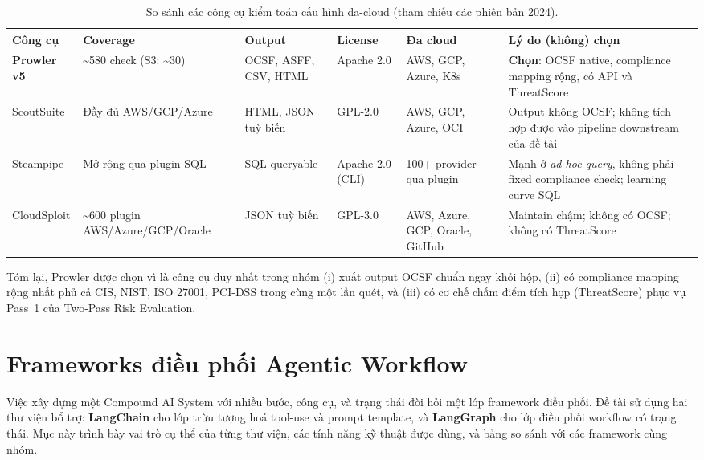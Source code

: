 \begin{table}[!htb]
\centering
\caption{So sánh các công cụ kiểm toán cấu hình đa-cloud (tham chiếu các phiên bản 2024).}
\label{tab:scanner-compare}
\footnotesize
\renewcommand{\arraystretch}{1.25}
\setlength{\tabcolsep}{4pt}
\begin{tabular}{|p{2.2cm}|p{2.0cm}|p{2.2cm}|p{1.4cm}|p{1.6cm}|p{2.6cm}|}
\hline
\textbf{Công cụ} & \textbf{Coverage} & \textbf{Output} & \textbf{License} & \textbf{Đa cloud} & \textbf{Lý do (không) chọn} \\ \hline
\textbf{Prowler v5} \cite{prowler} & {\raggedright \textasciitilde580 check (S3: \textasciitilde30) \par} & OCSF, ASFF, CSV, HTML & Apache 2.0 & AWS, GCP, Azure, K8s & \textbf{Chọn}: OCSF native, compliance mapping rộng, có API và ThreatScore \\ \hline
ScoutSuite \cite{scoutsuite} & Đầy đủ AWS/GCP/Azure & HTML, JSON tuỳ biến & GPL-2.0 & AWS, GCP, Azure, OCI & Output không OCSF; không tích hợp được vào pipeline downstream của đề tài \\ \hline
Steampipe \cite{steampipe_2024} & Mở rộng qua plugin SQL & SQL queryable & Apache 2.0 (CLI) & 100+ provider qua plugin & Mạnh ở \textit{ad-hoc query}, không phải fixed compliance check; learning curve SQL \\ \hline
CloudSploit \cite{cloudsploit_2024} & {\raggedright \textasciitilde600 plugin AWS/Azure/GCP/Oracle \par} & JSON tuỳ biến & GPL-3.0 & AWS, Azure, GCP, Oracle, GitHub & Maintain chậm; không có OCSF; không có ThreatScore \\ \hline
\end{tabular}
\end{table}

Tóm lại, Prowler được chọn vì là công cụ duy nhất trong nhóm (i) xuất output OCSF chuẩn ngay khỏi hộp, (ii) có compliance mapping rộng nhất phủ cả CIS, NIST, ISO 27001, PCI-DSS trong cùng một lần quét, và (iii) có cơ chế chấm điểm tích hợp (ThreatScore) phục vụ Pass~1 của Two-Pass Risk Evaluation.

\section{Frameworks điều phối Agentic Workflow}
\label{sec:orchestration-tool}

Việc xây dựng một Compound AI System với nhiều bước, công cụ, và trạng thái đòi hỏi một lớp framework điều phối. Đề tài sử dụng hai thư viện bổ trợ: \textbf{LangChain} cho lớp trừu tượng hoá tool-use và prompt template, và \textbf{LangGraph} cho lớp điều phối workflow có trạng thái. Mục này trình bày vai trò cụ thể của từng thư viện, các tính năng kỹ thuật được dùng, và bảng so sánh với các framework cùng nhóm.

